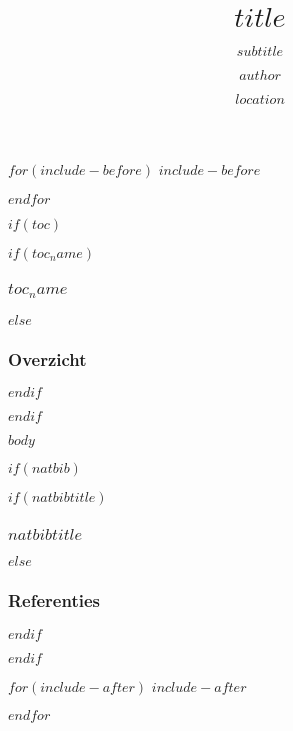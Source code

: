 \documentclass[$if(fontsize)$$fontsize$$else$10pt$endif$, $if(handout)$handout,$endif$ xetex, noamsthm]{beamer}
\title{$title$}
\subtitle{$subtitle$}
\author{$author$}
\institute{$institute$}
\date{$location$}
\date{}
\begin{document}
\begin{frame}[plain, label=intro, noframenumbering]
  \titlepage
\end{frame}

$for(include-before)$
$include-before$

$endfor$

$if(toc)$
\begin{frame}
$if(toc_name)$
  \frametitle{$toc_name$}
$else$
  \frametitle{Overzicht}
$endif$
	\tableofcontents
\end{frame}
$endif$

$body$


$if(natbib)$
\begin{frame}[allowframebreaks]
$if(natbibtitle)$
\frametitle{$natbibtitle$}
$else$
\frametitle{Referenties}
$endif$


\end{frame}
$endif$

$for(include-after)$
$include-after$

$endfor$
\end{document}
